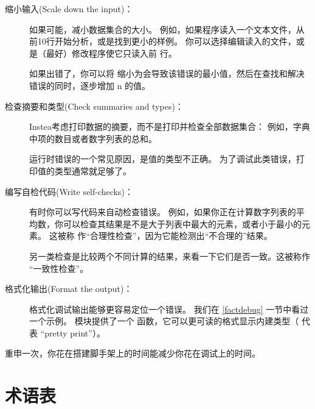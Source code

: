 \begin{description}

\item[缩小输入(Scale down the input)：] 如果可能，减小数据集合的大小。
    例如，如果程序读入一个文本文件，从前10行开始分析，或是找到更小的样例。
    你可以选择编辑读入的文件，或是（最好）修改程序使它只读入前  行。

    如果出错了，你可以将  缩小为会导致该错误的最小值，然后在查找和解决错误的同时，逐步增加 n 的值。

\item[检查摘要和类型(Check summaries and types)：] Instea考虑打印数据的摘要，而不是打印并检查全部数据集合：
    例如，字典中项的数目或者数字列表的总和。

    运行时错误的一个常见原因，是值的类型不正确。 为了调试此类错误，打印值的类型通常就足够了。

\item[编写自检代码(Write self-checks)：]  有时你可以写代码来自动检查错误。 例如，如果你正在计算数字列表的平均数，你可以检查其结果是不是大于列表中最大的元素，或者小于最小的元素。 这被称 作``合理性检查''，因为它能检测出``不合理的''结果。

  

另一类检查是比较两个不同计算的结果，来看一下它们是否一致。这被称作 ``一致性检查''。

\item[格式化输出(Format the output)：] 格式化调试输出能够更容易定位一个错误。 我们在 \ref{factdebug} 一节中看过一个示例。  模块提供了一个  函数，它可以更可读的格式显示内建类型（  代表 ``pretty print''）。

  

\end{description}


重申一次，你花在搭建脚手架上的时间能减少你花在调试上的时间。



\section{术语表}

